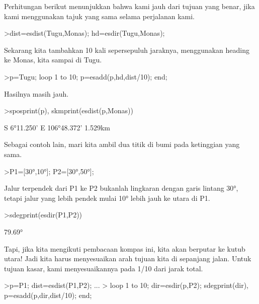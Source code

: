 \documentclass[12pt,arial,letterpaper]{book}
\begin{document}
\begin{eulernootebook}
\begin{eulercomment}
\begin{eulercomment}
\begin{eulernootebook}
\begin{eulercomment}
\begin{eulercomment}
\begin{eulercomment}
\begin{eulercomment}
\begin{eulercomment}
\begin{eulercomment}
\begin{eulernotebook}
\begin{eulercomment}
\begin{eulercomment}
\begin{eulercomment}
\begin{eulercomment}
\begin{eulercomment}
\begin{eulercomment}
\begin{eulercomment}
Perhitungan berikut menunjukkan bahwa kami jauh dari tujuan yang
benar, jika kami menggunakan tajuk yang sama selama perjalanan kami.
\end{eulercomment}
\begin{eulerprompt}
>dist=esdist(Tugu,Monas); hd=esdir(Tugu,Monas);
\end{eulerprompt}
\begin{eulercomment}
Sekarang kita tambahkan 10 kali sepersepuluh jaraknya, menggunakan
heading ke Monas, kita sampai di Tugu.
\end{eulercomment}
\begin{eulerprompt}
>p=Tugu; loop 1 to 10; p=esadd(p,hd,dist/10); end;
\end{eulerprompt}
\begin{eulercomment}
Hasilnya masih jauh.
\end{eulercomment}
\begin{eulerprompt}
>sposprint(p), skmprint(esdist(p,Monas))
\end{eulerprompt}
\begin{euleroutput}
  S 6°11.250' E 106°48.372'
       1.529km
\end{euleroutput}
\begin{eulercomment}
Sebagai contoh lain, mari kita ambil dua titik di bumi pada ketinggian
yang sama.
\end{eulercomment}
\begin{eulerprompt}
>P1=[30°,10°]; P2=[30°,50°];
\end{eulerprompt}
\begin{eulercomment}
Jalur terpendek dari P1 ke P2 bukanlah lingkaran dengan garis lintang
30°, tetapi jalur yang lebih pendek mulai 10° lebih jauh ke utara di
P1.
\end{eulercomment}
\begin{eulerprompt}
>sdegprint(esdir(P1,P2))
\end{eulerprompt}
\begin{euleroutput}
       79.69°
\end{euleroutput}
\begin{eulercomment}
Tapi, jika kita mengikuti pembacaan kompas ini, kita akan berputar ke
kutub utara! Jadi kita harus menyesuaikan arah tujuan kita di
sepanjang jalan. Untuk tujuan kasar, kami menyesuaikannya pada 1/10
dari jarak total.
\end{eulercomment}
\begin{eulerprompt}
>p=P1;  dist=esdist(P1,P2); ...
>  loop 1 to 10; dir=esdir(p,P2); sdegprint(dir), p=esadd(p,dir,dist/10); end;

\end{eulerprompt}
\end{eulercomment}
\end{eulercomment}
\end{eulercomment}
\end{eulercomment}
\end{eulercomment}
\end{eulercomment}
\end{eulernotebook}
\end{eulercomment}
\end{eulercomment}
\end{eulercomment}
\end{eulercomment}
\end{eulercomment}
\end{eulercomment}
\end{eulernootebook}
\end{eulercomment}
\end{eulercomment}
\end{eulernootebook}
\end{document}
